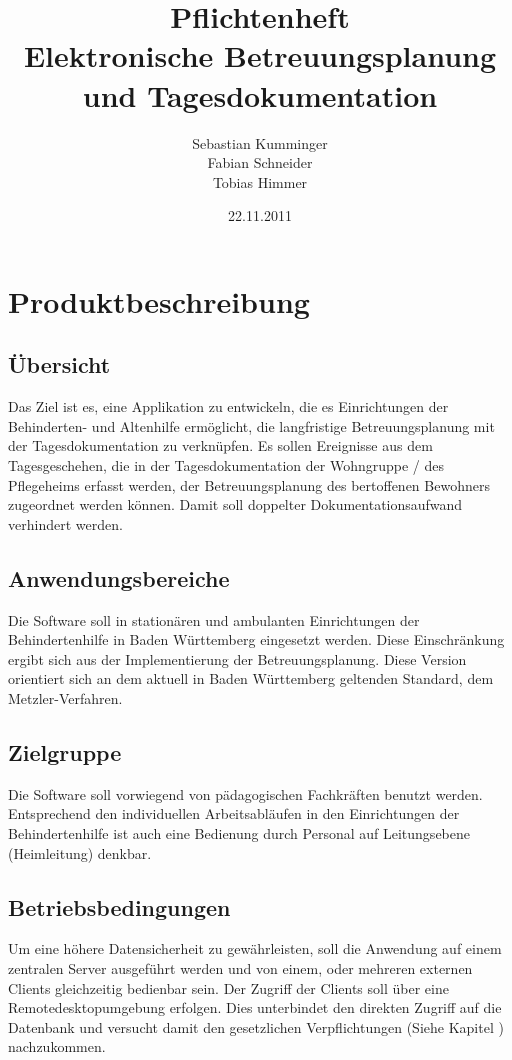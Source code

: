 \documentclass[a4paper,10pt]{article}
\author{Sebastian Kumminger\\
	Fabian Schneider\\
	Tobias Himmer}
\title{Pflichtenheft\\
	Elektronische Betreuungsplanung und Tagesdokumentation}
\date{22.11.2011}
\begin{document}
\maketitle

\tableofcontents
\newpage

\section{Produktbeschreibung}
\subsection{Übersicht}
Das Ziel ist es, eine Applikation zu entwickeln, die es Einrichtungen der Behinderten- und Altenhilfe ermöglicht,
die langfristige Betreuungsplanung mit der Tagesdokumentation zu verknüpfen. Es sollen Ereignisse aus dem Tagesgeschehen,
die in der Tagesdokumentation der Wohngruppe / des Pflegeheims erfasst werden,
der Betreuungsplanung des bertoffenen Bewohners zugeordnet werden können.
Damit soll doppelter Dokumentationsaufwand verhindert werden.
\subsection{Anwendungsbereiche}
Die Software soll in stationären und ambulanten Einrichtungen der Behindertenhilfe in Baden Württemberg eingesetzt werden. 
Diese Einschränkung ergibt sich aus der Implementierung der Betreuungsplanung. Diese Version orientiert sich an dem aktuell in Baden Württemberg geltenden 
Standard, dem Metzler-Verfahren. 
\subsection{Zielgruppe}
Die Software soll vorwiegend von pädagogischen Fachkräften benutzt werden. Entsprechend den individuellen Arbeitsabläufen in den 
Einrichtungen der Behindertenhilfe ist auch eine Bedienung durch Personal auf Leitungsebene (Heimleitung) denkbar.
\subsection{Betriebsbedingungen}
Um eine höhere Datensicherheit zu gewährleisten, soll die Anwendung auf einem
zentralen Server ausgeführt werden und von einem, oder mehreren externen Clients gleichzeitig bedienbar sein.
Der Zugriff der Clients soll über eine Remotedesktopumgebung erfolgen.
Dies unterbindet den direkten Zugriff auf die Datenbank und versucht damit den gesetzlichen Verpflichtungen (Siehe Kapitel \pageref{subsec:dasi}) nachzukommen.
\end{document}
